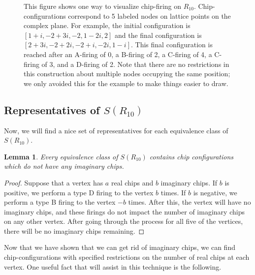 \documentclass[12p]{amsart}
\numberwithin{equation}{section}
\theoremstyle{plain}
\newtheorem{lemma}[thm]{Lemma}
\theoremstyle{definition}
\begin{document}
\begin{figure}
\begin{center}
    \caption{This figure shows one way to visualize chip-firing on $R_{10}$. Chip-configurations correspond to 5 labeled nodes on lattice points on the complex plane. For example, the initial configuration is $[1+i, -2 + 3i, -2, 1-2i, 2]$ and the final configuration is $[2+3i, -2 + 2i, -2 + i,-2i, 1-i]$. This final configuration is reached after an A-firing of 0, a B-firing of 2, a C-firing of 4, a C-firing of 3, and a D-firing of 2. Note that there are no restrictions in this construction about multiple nodes occupying the same position; we only avoided this for the example to make things easier to draw.}
    \label{fig:geometric}
\end{center}
\end{figure}

\subsection{Representatives of $S(R_{10})$}
Now, we will find a nice set of representatives for each equivalence class of $S(R_{10})$. 

\begin{lemma}\label{lem:no_i}
    Every equivalence class of $S(R_{10})$ contains chip configurations which do not have any imaginary chips. 
\end{lemma}
\begin{proof}
    Suppose that a vertex has $a$ real chips and $b$ imaginary chips. If $b$ is positive, we perform a type D firing to the vertex $b$ times. If $b$ is negative, we perform a type B firing to the vertex $-b$ times. After this, the vertex will have no imaginary chips, and these firings do not impact the number of imaginary chips on any other vertex. After going through the process for all five of the vertices, there will be no imaginary chips remaining. 
\end{proof}

Now that we have shown that we can get rid of imaginary chips, we can find chip-configurations with specified restrictions on the number of real chips at each vertex. One useful fact that will assist in this technique is the following. 
\end{document}
